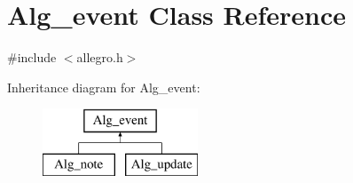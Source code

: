 \hypertarget{class_alg__event}{}\section{Alg\+\_\+event Class Reference}
\label{class_alg__event}


{\ttfamily \#include $<$allegro.\+h$>$}

Inheritance diagram for Alg\+\_\+event\+:\begin{figure}[H]
\begin{center}
\leavevmode
\includegraphics[height=2.000000cm]{class_alg__event}
\end{center}
\end{figure}
